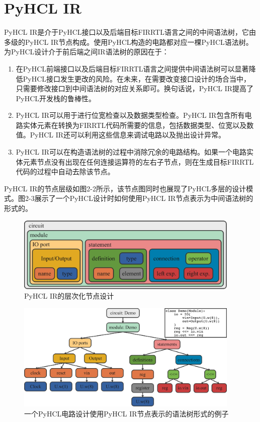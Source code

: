 \section{PyHCL IR}

PyHCL IR是介于PyHCL接口以及后端目标FIRRTL语言之间的中间语法树，它由多级的PyHCL IR节点构成。使用PyHCL构造的电路都对应一棵PyHCL语法树。为PyHCL设计介于前后端之间IR语法树的原因在于：

\begin{enumerate}
	\item 在PyHCL前端接口以及后端目标FIRRTL语言之间提供中间语法树可以显著降低PyHCL接口发生更改的风险。在未来，在需要改变接口设计的场合当中，只需要修改接口到中间语法树的对应关系即可。换句话说，PyHCL IR提高了PyHCL开发栈的鲁棒性。
	\item PyHCL IR可以用于进行位宽检查以及数据类型检查。PyHCL IR包含所有电路实体元素在转换为FIRRTL代码所需要的信息，包括数据类型、位宽以及数值。PyHCL IR还可以利用这些信息来调试电路以及抛出设计异常。
	\item PyHCL IR可以在构造语法树的过程中消除冗余的电路结构。如果一个电路实体元素节点没有出现在任何连接运算符的左右子节点，则在生成目标FIRRTL代码的过程中自动去除该节点。
\end{enumerate}

PyHCL IR的节点层级如图2-2所示，该节点图同时也展现了PyHCL多层的设计模式。图2-3展示了一个PyHCL设计时如何使用PyHCL IR节点表示为中间语法树的形式的。

\begin{figure}[htbp]
	\centering
	\includegraphics[width=0.95\textwidth]{Photos/PyHCL_IR-Structure.jpg}
	\caption{PyHCL IR的层次化节点设计}
\end{figure}

\begin{figure}[htbp]
	\centering
	\includegraphics[width=0.95\textwidth]{Photos/PyHCL_IR-Example.jpg}
	\caption{一个PyHCL电路设计使用PyHCL IR节点表示的语法树形式的例子}
\end{figure}

